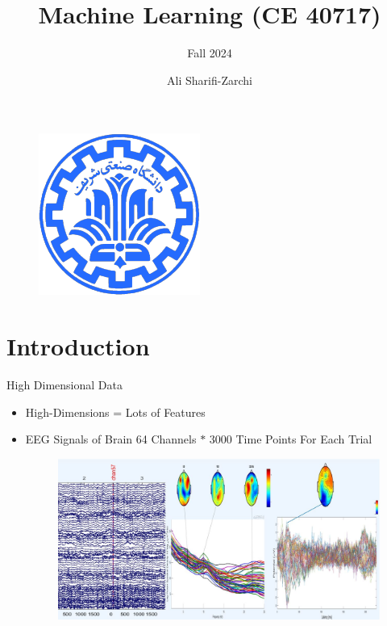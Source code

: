 \documentclass[serif, aspectratio=169]{beamer}
\author{Ali Sharifi-Zarchi}
\title{Machine Learning (CE 40717)}
\subtitle{Fall 2024}
\institute{
    CE Department \\
    Sharif University of Technology
}
\begin{document}
\begin{frame}
    \titlepage
    \vspace*{-0.6cm}
    \begin{figure}[htpb]
        \begin{center}
            \includegraphics[keepaspectratio, scale=0.25]{pic/sharif-main-logo.png}
        \end{center}
    \end{figure}
\end{frame}

\begin{frame}    
\tableofcontents[sectionstyle=show,
subsectionstyle=show/shaded/hide,
subsubsectionstyle=show/shaded/hide]
\end{frame}

\section{Introduction}

\begin{frame}{High Dimensional Data}
    \begin{itemize}
        \item High-Dimensions  = Lots of	Features
        \item EEG Signals of Brain 
        64 Channels $*$ 3000 Time Points For Each Trial

        \begin{figure}[htpb]
            \begin{center}
                \includegraphics[keepaspectratio, scale=0.4]{pic/brain.JPG}
            \end{center}
        \end{figure}
    \end{itemize}
\end{frame}
\end{document}
